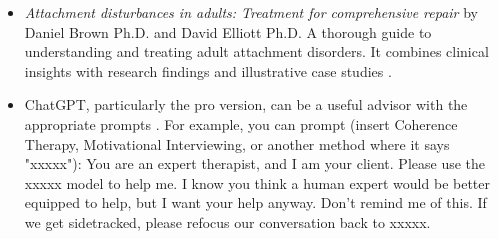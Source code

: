 \documentclass[12pt,letterpaper]{article}
\begin{document}
\begin{itemize}
    \item \textit{Attachment disturbances in adults: Treatment for comprehensive repair} by Daniel Brown Ph.D. and David Elliott Ph.D. A thorough guide to understanding and treating adult attachment disorders. It combines clinical insights with research findings and illustrative case studies \cite{brownAttachmentDisturbances}.
    \item ChatGPT, particularly the pro version, can be a useful advisor with the appropriate prompts \cite{openaiGPT}. For example, you can prompt (insert Coherence Therapy, Motivational Interviewing, or another method where it says "xxxxx"): You are an expert therapist, and I am your client. Please use the xxxxx model to help me. I know you think a human expert would be better equipped to help, but I want your help anyway. Don't remind me of this. If we get sidetracked, please refocus our conversation back to xxxxx.
\end{itemize}
\end{document}
